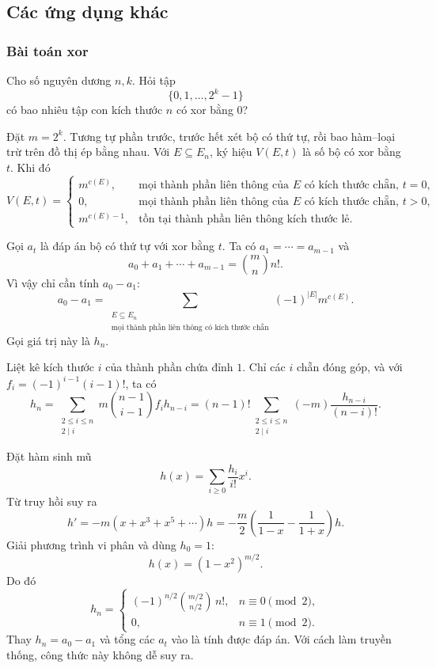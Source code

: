 \documentclass[11pt]{article}
\begin{document}
\subsection{Các ứng dụng khác}

\subsubsection{Bài toán xor}

Cho số nguyên dương $n,k$. Hỏi tập
\[
  \{0,1,\ldots,2^k-1\}
\]
có bao nhiêu tập con kích thước $n$ có xor bằng $0$?

Đặt $m=2^k$. Tương tự phần trước, trước hết xét bộ có thứ tự, rồi
bao hàm--loại trừ trên đồ thị ép bằng nhau. Với $E\subseteq E_n$, ký hiệu
$V(E,t)$ là số bộ có xor bằng $t$. Khi đó
\[
  V(E,t)=
  \begin{cases}
    m^{c(E)}, & \text{mọi thành phần liên thông của }E\text{ có kích thước chẵn, }t=0,\\
    0, & \text{mọi thành phần liên thông của }E\text{ có kích thước chẵn, }t>0,\\
    m^{c(E)-1}, & \text{tồn tại thành phần liên thông kích thước lẻ.}
  \end{cases}
\]

Gọi $a_t$ là đáp án bộ có thứ tự với xor bằng $t$. Ta có
$a_1=\cdots=a_{m-1}$ và
\[
  a_0+a_1+\cdots+a_{m-1}=\binom mn n!.
\]
Vì vậy chỉ cần tính $a_0-a_1$:
\[
  a_0-a_1=
  \sum_{\substack{E\subseteq E_n\\
  \text{mọi thành phần liên thông có kích thước chẵn}}}
  (-1)^{|E|}m^{c(E)}.
\]
Gọi giá trị này là $h_n$.

Liệt kê kích thước $i$ của thành phần chứa đỉnh $1$. Chỉ các $i$ chẵn đóng góp,
và với $f_i=(-1)^{i-1}(i-1)!$, ta có
\[
  h_n=\sum_{\substack{2\le i\le n\\2\mid i}}
  m\binom{n-1}{i-1}f_i h_{n-i}
  =
  (n-1)!\sum_{\substack{2\le i\le n\\2\mid i}}
  (-m)\frac{h_{n-i}}{(n-i)!}.
\]

Đặt hàm sinh mũ
\[
  h(x)=\sum_{i\ge 0}\frac{h_i}{i!}x^i.
\]
Từ truy hồi suy ra
\[
  h'=-m(x+x^3+x^5+\cdots)h
  =-\frac m2\left(\frac1{1-x}-\frac1{1+x}\right)h.
\]
Giải phương trình vi phân và dùng $h_0=1$:
\[
  h(x)=(1-x^2)^{m/2}.
\]
Do đó
\[
  h_n=
  \begin{cases}
    (-1)^{n/2}\binom{m/2}{n/2}\,n!, & n\equiv 0\pmod 2,\\
    0, & n\equiv 1\pmod 2.
  \end{cases}
\]
Thay $h_n=a_0-a_1$ và tổng các $a_t$ vào là tính được đáp án. Với cách làm
truyền thống, công thức này không dễ suy ra.
\end{document}
